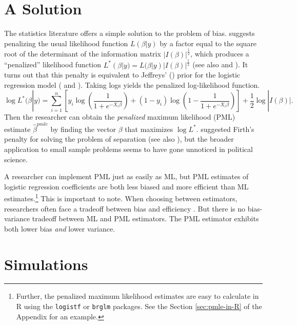 \documentclass[12pt]{article}
\begin{document}
\section*{A Solution}

The statistics literature offers a simple solution to the problem of bias. 
\cite{Firth1993} suggests penalizing the usual likelihood function $L(\beta | y)$ by a factor equal to the square root of the determinant of the information matrix $|I(\beta)|^\frac{1}{2}$, which produces a ``penalized'' likelihood function $L^*(\beta | y) = L(\beta | y)|I(\beta)|^\frac{1}{2}$ (see also \citealt{KosmidisFirth2009} and \citealt{Kosmidis2014}). 
It turns out that this penalty is equivalent to Jeffreys' (\citeyear{Jeffreys1946}) prior for the logistic regression model (\citealt{Firth1993} and \citealt{Poirier1994}).
Taking logs yields the penalized log-likelihood function.
\begin{equation}\nonumber
\log L^*(\beta | y) = \displaystyle \sum_{i = 1}^n \left[y_i \log \left( \dfrac{1}{1 + e^{-X_i\beta}}\right) + (1 - y_i) \log \left(1 - \dfrac{1}{1 + e^{-X_i\beta}}\right)\right] + \dfrac{1}{2} \log |I(\beta)|.
\end{equation}
Then the researcher can obtain the \emph{penalized} maximum likelihood (PML) estimate $\hat{\beta}^{pmle}$ by finding the vector $\beta$ that maximizes $\log L^*$. 
\cite{Zorn2005} suggested Firth's penalty for solving the problem of separation (see also \citealt{Rainey-separation}), but the broader application to small sample problems seems to have gone unnoticed in political science.

A researcher can implement PML just as easily as ML, but PML estimates of logistic regression coefficients are both less biased \citep{Firth1993} and more efficient \citep[p. 49]{Kosmidis2007} than ML estimates.\footnote{Further, the penalized maximum likelihood estimates are easy to calculate in R using the \texttt{logistf} or \texttt{brglm} packages. 
See the Section \ref{sec:pmle-in-R} of the Appendix for an example.}
This is important to note. 
When choosing between estimators, researchers often face a tradeoff between bias and efficiency \citep[pp. 37-38]{HastieTibshiraniFriedman2013}.
But there is no bias-variance tradeoff between ML and PML estimators.
The PML estimator exhibits both lower bias \textit{and} lower variance.

\section*{Simulations}
\end{document}
